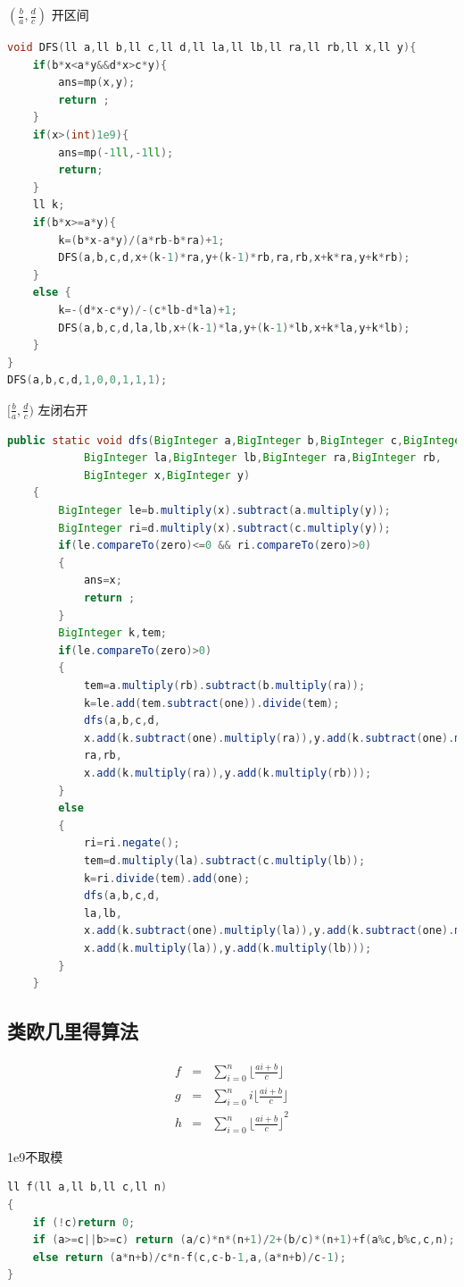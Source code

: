 \documentclass[UTF8,a4paper,titlepage]{ctexart}
\begin{document}
$(\frac{b}{a},\frac{d}{c})$ 开区间
\begin{lstlisting}[language=C++]
void DFS(ll a,ll b,ll c,ll d,ll la,ll lb,ll ra,ll rb,ll x,ll y){
	if(b*x<a*y&&d*x>c*y){
		ans=mp(x,y);
		return ;
	}
	if(x>(int)1e9){
		ans=mp(-1ll,-1ll);
		return;
	}
	ll k;
	if(b*x>=a*y){
		k=(b*x-a*y)/(a*rb-b*ra)+1;
		DFS(a,b,c,d,x+(k-1)*ra,y+(k-1)*rb,ra,rb,x+k*ra,y+k*rb);
	}
	else {
        k=-(d*x-c*y)/-(c*lb-d*la)+1;
		DFS(a,b,c,d,la,lb,x+(k-1)*la,y+(k-1)*lb,x+k*la,y+k*lb);
	}
}
DFS(a,b,c,d,1,0,0,1,1,1);
\end{lstlisting}
$[\frac{b}{a},\frac{d}{c})$ 左闭右开
\begin{lstlisting}[language=Java]
public static void dfs(BigInteger a,BigInteger b,BigInteger c,BigInteger d,
    		BigInteger la,BigInteger lb,BigInteger ra,BigInteger rb,
    		BigInteger x,BigInteger y)
    {
        BigInteger le=b.multiply(x).subtract(a.multiply(y));
        BigInteger ri=d.multiply(x).subtract(c.multiply(y));
        if(le.compareTo(zero)<=0 && ri.compareTo(zero)>0)
        {
            ans=x;
            return ;
        }
        BigInteger k,tem;
        if(le.compareTo(zero)>0)
        {
            tem=a.multiply(rb).subtract(b.multiply(ra));
            k=le.add(tem.subtract(one)).divide(tem);
            dfs(a,b,c,d,
            x.add(k.subtract(one).multiply(ra)),y.add(k.subtract(one).multiply(rb)),
            ra,rb,
            x.add(k.multiply(ra)),y.add(k.multiply(rb)));
        }
        else
        {
            ri=ri.negate();
            tem=d.multiply(la).subtract(c.multiply(lb));
            k=ri.divide(tem).add(one);
            dfs(a,b,c,d,
            la,lb,
            x.add(k.subtract(one).multiply(la)),y.add(k.subtract(one).multiply(lb)),
            x.add(k.multiply(la)),y.add(k.multiply(lb)));
        }
    }
\end{lstlisting}
\subsection{类欧几里得算法}
\begin{eqnarray*}
	f&=&\sum_{i=0}^n\lfloor\frac{ai+b}{c}\rfloor\\
	g&=&\sum_{i=0}^ni\lfloor\frac{ai+b}{c}\rfloor\\
	h&=&\sum_{i=0}^n{\lfloor\frac{ai+b}{c}\rfloor}^2
\end{eqnarray*}

1e9不取模
\begin{lstlisting}[language=C++]
ll f(ll a,ll b,ll c,ll n)
{
    if (!c)return 0;
    if (a>=c||b>=c) return (a/c)*n*(n+1)/2+(b/c)*(n+1)+f(a%c,b%c,c,n);
    else return (a*n+b)/c*n-f(c,c-b-1,a,(a*n+b)/c-1);
}
\end{lstlisting}
\end{document}
